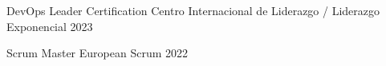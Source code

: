 

\begin{cvhonors}
  \cvhonor
    {DevOps Leader Certification} %
    {Centro Internacional de Liderazgo / Liderazgo Exponencial} %
    {} %
    {2023} %

  \cvhonor
  {Scrum Master} %
  {European Scrum} %
  {} %
  {2022} %

\end{cvhonors}
